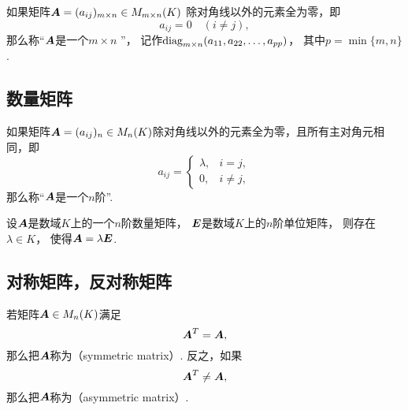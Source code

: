 \begin{definition}
如果矩阵\(\boldsymbol{A}=(a_{ij})_{m \times n} \in M_{m \times n}(K)\)
除对角线以外的元素全为零，即\begin{equation*}
	a_{ij} = 0
	\quad(i \neq j),
\end{equation*}
那么称“\(\boldsymbol{A}\)是一个\(m \times n\) ”，
记作\(\operatorname{diag}_{m \times n}(a_{11},a_{22},\dotsc,a_{pp})\)，
其中\(p = \min\{m,n\}\).
\end{definition}

\subsection{数量矩阵}
\begin{definition}
如果矩阵\(\boldsymbol{A}=(a_{ij})_n \in M_n(K)\)除对角线以外的元素全为零，且所有主对角元相同，即\begin{equation*}
	a_{ij} = \left\{ \begin{array}{cl}
		\lambda, & i = j, \\
		0, & i \neq j,
	\end{array} \right.
\end{equation*}
那么称“\(\boldsymbol{A}\)是一个\(n\)阶”.
\end{definition}

\begin{proposition}
设\(\boldsymbol{A}\)是数域\(K\)上的一个\(n\)阶数量矩阵，
\(\boldsymbol{E}\)是数域\(K\)上的\(n\)阶单位矩阵，
则存在\(\lambda \in K\)，
使得\(\boldsymbol{A} = \lambda \boldsymbol{E}\).
\end{proposition}

\subsection{对称矩阵，反对称矩阵}
\begin{definition}
若矩阵\(\boldsymbol{A} \in M_n(K)\)满足\begin{equation*}
    \boldsymbol{A}^T = \boldsymbol{A},
\end{equation*}
那么把\(\boldsymbol{A}\)称为（symmetric matrix）.
反之，如果\begin{equation*}
	\boldsymbol{A}^T \neq \boldsymbol{A},
\end{equation*}
那么把\(\boldsymbol{A}\)称为（asymmetric matrix）.
\end{definition}

